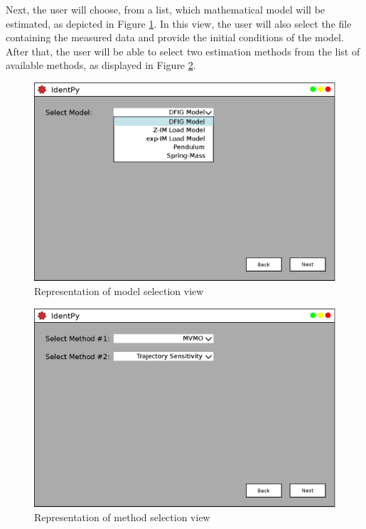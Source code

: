 Next, the user will choose, from a list, which mathematical model will be estimated, as depicted in Figure \ref{fig: model_selection}. In this view, the user will also select the file containing the measured data and provide the initial conditions of the model. After that, the user will be able to select two estimation methods from the list of available methods, as displayed in Figure \ref{fig: method_selection}.

\begin{figure}[h]
	\caption{Representation of model selection view}
	\begin{center}
		\includegraphics[scale=.5]{Images/Software_pg1.eps}
	\end{center}
	\label{fig: model_selection}
\end{figure}

\begin{figure}[h]
	\caption{Representation of method selection view}
	\begin{center}
		\includegraphics[scale=.5]{Images/Software_pg2.eps}
	\end{center}
	\label{fig: method_selection}
\end{figure}

